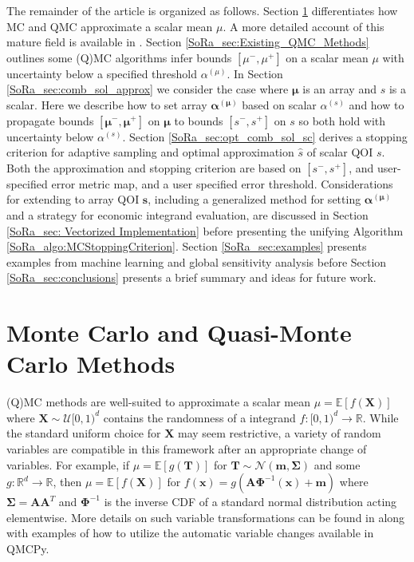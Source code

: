\documentclass[graybox]{svmult}
\begin{document}
The remainder of the article is organized as follows. Section \ref{SoRa_sec:MCM} differentiates how MC and QMC approximate a scalar mean $\mu$. A more detailed account of this mature field is available in \cite{niederreiter1992random}. Section \ref{SoRa_sec:Existing_QMC_Methods} outlines some (Q)MC algorithms infer bounds $[\mu^-,\mu^+]$ on a scalar mean $\mu$ with uncertainty below a specified threshold $\alpha^{(\mu)}$. In Section \ref{SoRa_sec:comb_sol_approx} we consider the case where $\boldsymbol{\mu}$ is an array and $s$ is a scalar. Here we describe how to set array $\boldsymbol{\alpha}^{(\boldsymbol{\mu})}$ based on scalar $\alpha^{(s)}$ and how to propagate bounds $[\boldsymbol{\mu}^-,\boldsymbol{\mu}^+]$ on $\boldsymbol{\mu}$ to bounds $[s^-,s^+]$ on $s$ so both hold with uncertainty below $\alpha^{(s)}$. Section \ref{SoRa_sec:opt_comb_sol_sc} derives a stopping criterion for adaptive sampling and optimal approximation $\hat{s}$ of scalar QOI $s$. Both the approximation and stopping criterion are based on $[s^-,s^+]$, and user-specified error metric map, and a user specified error threshold. Considerations for extending to array QOI $\boldsymbol{s}$, including a generalized method for setting $\boldsymbol{\alpha}^{(\boldsymbol{\mu})}$ and a strategy for economic integrand evaluation, are discussed in Section \ref{SoRa_sec: Vectorized Implementation} before presenting the unifying Algorithm \ref{SoRa_algo:MCStoppingCriterion}. Section \ref{SoRa_sec:examples} presents examples from machine learning and global sensitivity analysis before Section \ref{SoRa_sec:conclusions} presents a brief summary and ideas for future work.   

\section{Monte Carlo and Quasi-Monte Carlo Methods} \label{SoRa_sec:MCM}

(Q)MC methods are well-suited to approximate a scalar mean $\mu = \mathbb{E}[f(\boldsymbol{X})]$ where $\boldsymbol{X} \sim \mathcal{U}[0,1)^d$ contains the randomness of a integrand $f: [0,1)^{d} \to \mathbb{R}$. While the standard uniform choice for $\boldsymbol{X}$ may seem restrictive, a variety of random variables are compatible in this framework after an appropriate change of variables. For example, if $\mu = \mathbb{E}[g(\boldsymbol{T})]$ for $\boldsymbol{T} \sim \mathcal{N}(\boldsymbol{m},\boldsymbol{\Sigma})$ and some $g: \mathbb{R}^{d} \to \mathbb{R}$, then $\mu = \mathbb{E}[f(\boldsymbol{X})]$ for  $f(\boldsymbol{x})=g(\boldsymbol{A}\boldsymbol{\Phi}^{-1}(\boldsymbol{x})+\boldsymbol{m})$ where $\boldsymbol{\Sigma}=\boldsymbol{A}\boldsymbol{A}^T$ and $\boldsymbol{\Phi}^{-1}$ is the inverse CDF of a standard normal distribution acting elementwise. More details on such variable transformations can be found in \cite{QMCSoftware} along with examples of how to utilize the automatic variable changes available in QMCPy.
\end{document}
